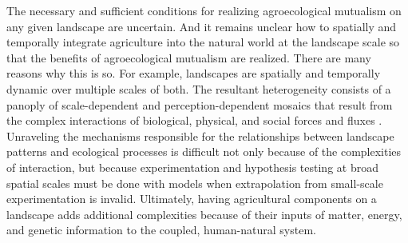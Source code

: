 The necessary and sufficient conditions for realizing agroecological mutualism on any given landscape are uncertain. And it remains unclear how to spatially and temporally integrate agriculture into the natural world at the landscape scale so that the benefits of agroecological mutualism are realized. There are many reasons why this is so. For example, landscapes are spatially and temporally dynamic over multiple scales of both. The resultant heterogeneity consists of a panoply of scale-dependent and perception-dependent mosaics that result from the complex interactions of biological, physical, and social forces and fluxes \citep{turner_landscape_1989}. Unraveling the mechanisms responsible for the relationships between landscape patterns and ecological processes is difficult not only because of the complexities of interaction, but because experimentation and hypothesis testing at broad spatial scales must be done with models when extrapolation from small-scale experimentation is invalid. Ultimately, having agricultural components on a landscape adds additional complexities because of their inputs of matter, energy, and genetic information to the coupled, human-natural system.


